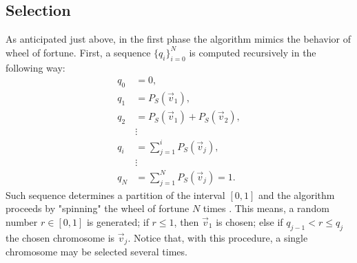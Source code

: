 \documentclass[%
    corpo=11pt,
    twoside,
    stile=classica,
    oldstyle,
    autoretitolo,
    tipotesi=magistrale,
    greek,
    evenboxes,
    english
]{toptesi}
\begin{document}
\subsection{Selection}
As anticipated just above, in the first phase the algorithm mimics the behavior of wheel of fortune. First, a sequence $\{q_i\}_{i=0}^{N}$ is computed recursively in the following way:
\begin{align}
q_0 &= 0, \nonumber \\
q_1 &= P_S(\vec{v}_1), \nonumber \\
q_2 &= P_S(\vec{v}_1) + P_S(\vec{v}_2), \nonumber \\
&\vdots \nonumber \\
q_i &= \sum_{j=1}^{i}P_S(\vec{v}_j), \nonumber \\
&\vdots \nonumber \\
q_N &= \sum_{j=1}^{N}P_S(\vec{v}_j) = 1.
\end{align}
Such sequence determines a partition of the interval $\left[0,1\right]$ and the algorithm proceeds by "spinning" the wheel of fortune $N$ times . This means, a random number $r\in \left[0,1\right]$ is generated; if $r \leq 1$, then $\vec{v}_1$ is chosen; else if $q_{j-1} < r \leq q_j$ the chosen chromosome is $\vec{v}_j$. Notice that, with this procedure, a single chromosome may be selected several times. 
\end{document}
